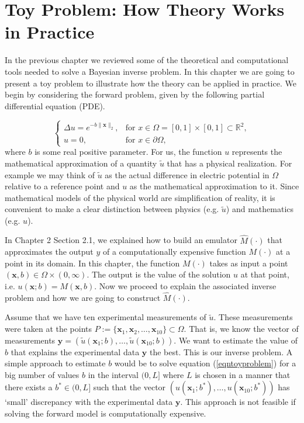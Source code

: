 \documentclass[12pt]{book}
\newcommand{\x}{\textbf{x}}
\newcommand{\y}{\textbf{y}}
\begin{document}
\chapter{Toy Problem: How Theory Works in Practice}

In the previous chapter we reviewed some  of the theoretical and computational tools needed to solve
a Bayesian inverse problem. In this chapter
we are going to present  a toy problem to illustrate how the theory  can be applied in practice.
We begin by considering the forward problem, given by the following partial differential equation (PDE).

\begin{equation}\label{eqntoyproblem}
\left\{
	\begin{array}{ll}
		\Delta u=e^{-b\|\x\|_{2}}, &\mbox{for } x\in\Omega=[0,1]\times [0,1]\subset\mathbb{R}^{2}, \\
		u=0, & \mbox{for } x\in\partial\Omega,
	\end{array}
\right.
\end{equation} 
where $b$ is some real positive parameter. For us, the 
function $u$ represents the mathematical approximation of  a quantity $\tilde{u}$ that has a physical realization. 
For example we may think of $\tilde{u}$ as the actual difference in  electric potential in $\Omega$ relative to a reference point
and $u$ as the mathematical approximation to it. Since mathematical models of the physical world are  simplification
of  reality, it is convenient to make a clear distinction between physics (e.g. $\tilde{u}$) and mathematics (e.g. $u$).

In Chapter 2 Section 2.1, we explained how to build an emulator $\hat{M}(\cdot)$  that approximates
the output $y$  of a computationally expensive function  $M(\cdot)$ at a point  in its domain. 
In  this chapter, the function $M(\cdot)$ takes as input a point  $(\textbf{x},b)\in\Omega\times(0,\infty)$. The
output is the value of the solution $u$ at that 
point, i.e. $u(\textbf{x};b)=M(\textbf{x},b)$. Now we proceed to explain the associated inverse problem and  how we are going to construct $\hat{M}(\cdot)$.  

Assume that we have ten experimental measurements 
of $\tilde{u}$. These measurements were taken  at the points $P:=\{\x_{1},\x_{2},\ldots,\x_{10}\}\subset\Omega$. 
That is, we know the vector of measurements 
$\textbf{y}=(\tilde{u}(\x_{1};b),\ldots,\tilde{u}(\x_{10};b))$.
We want to estimate the value of $b$ that explains  the experimental data $\textbf{y}$ the best. 
This is our inverse problem. 
A simple approach to estimate $b$ 
would be to solve equation (\ref{eqntoyproblem}) for a big number of values $b$ in the interval $(0,L]$ where $L$ 
is chosen in a manner that there exists a $b^{*}\in (0,L]$ such that the vector 
$(u(\x_{1};b^{*}),\ldots,u(\x_{10};b^{*}))$
has `small' discrepancy with the experimental data $\y$. This approach is not feasible if solving the forward
model is computationally expensive. 
\end{document}
